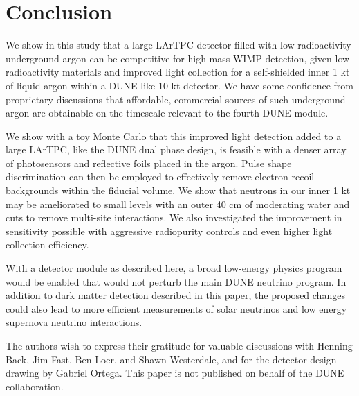 \documentclass[a4paper,11pt]{article}
\begin{document}
\section{Conclusion}
We show in this study that a large LArTPC detector filled with low-radioactivity underground argon can be competitive for high mass WIMP detection, given low radioactivity materials and improved light collection for a self-shielded inner 1 kt of liquid argon within a DUNE-like 10 kt detector. We have some confidence from proprietary discussions that affordable, commercial sources of such underground argon are obtainable on the timescale relevant to the fourth DUNE module.

We show with a toy Monte Carlo that this improved light detection added to a large LArTPC, like the DUNE dual phase design, is feasible with a denser array of photosensors and reflective foils placed in the argon. Pulse shape discrimination can then be employed to effectively remove electron recoil backgrounds within the fiducial volume. We show that neutrons in our inner 1 kt may be ameliorated to small levels with an outer 40 cm of moderating water and cuts to remove multi-site interactions. We also investigated the improvement in sensitivity possible with aggressive radiopurity controls and even higher light collection efficiency.

With a detector module as described here, a broad low-energy physics program would be enabled that would not perturb the main DUNE neutrino program. In addition to dark matter detection described in this paper, the proposed changes could also lead to more efficient measurements of solar neutrinos and low energy supernova neutrino interactions. 

\acknowledgments
The authors wish to express their gratitude for valuable discussions with Henning Back, Jim Fast, Ben Loer, and Shawn Westerdale,  and for the detector design drawing by Gabriel Ortega. This paper is not published on behalf of the DUNE collaboration.

\end{document}
